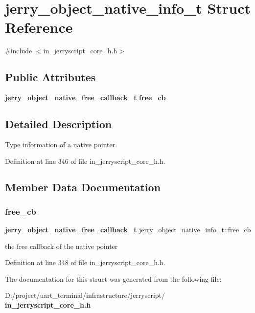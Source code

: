 \section{jerry\+\_\+object\+\_\+native\+\_\+info\+\_\+t Struct Reference}
\label{structjerry__object__native__info__t}


{\ttfamily \#include $<$in\+\_\+jerryscript\+\_\+core\+\_\+h.\+h$>$}

\subsection*{Public Attributes}
\begin{DoxyCompactItemize}
\item 
\textbf{ jerry\+\_\+object\+\_\+native\+\_\+free\+\_\+callback\+\_\+t} \textbf{ free\+\_\+cb}
\end{DoxyCompactItemize}


\subsection{Detailed Description}
Type information of a native pointer. 

Definition at line 346 of file in\+\_\+jerryscript\+\_\+core\+\_\+h.\+h.



\subsection{Member Data Documentation}
\mbox{\label{structjerry__object__native__info__t_ad5c001a6e771d849b1511a8ccdf42511}} 
\subsubsection{free\_cb}
{\footnotesize\ttfamily \textbf{ jerry\+\_\+object\+\_\+native\+\_\+free\+\_\+callback\+\_\+t} jerry\+\_\+object\+\_\+native\+\_\+info\+\_\+t\+::free\+\_\+cb}

the free callback of the native pointer 

Definition at line 348 of file in\+\_\+jerryscript\+\_\+core\+\_\+h.\+h.



The documentation for this struct was generated from the following file\+:\begin{DoxyCompactItemize}
\item 
D\+:/project/uart\+\_\+terminal/infrastructure/jerryscript/\textbf{ in\+\_\+jerryscript\+\_\+core\+\_\+h.\+h}\end{DoxyCompactItemize}
